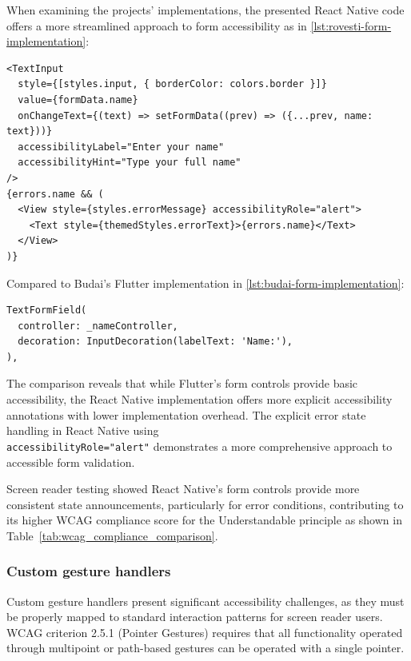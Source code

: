 When examining the projects' implementations, the presented React Native code offers a more streamlined approach to form accessibility as in \ref{lst:rovesti-form-implementation}:

\begin{lstlisting}[style=ReactNativeStyle, caption=Form implementation in AccessibleHub's React Native code, label=lst:rovesti-form-implementation]
<TextInput
  style={[styles.input, { borderColor: colors.border }]}
  value={formData.name}
  onChangeText={(text) => setFormData((prev) => ({...prev, name: text}))}
  accessibilityLabel="Enter your name"
  accessibilityHint="Type your full name"
/>
{errors.name && (
  <View style={styles.errorMessage} accessibilityRole="alert">
    <Text style={themedStyles.errorText}>{errors.name}</Text>
  </View>
)}
\end{lstlisting}

\pagebreak

Compared to Budai's Flutter implementation in \ref{lst:budai-form-implementation}:

\begin{lstlisting}[style=DartStyle, caption=Form implementation in Budai's Flutter code, label=lst:budai-form-implementation]
TextFormField(
  controller: _nameController,
  decoration: InputDecoration(labelText: 'Name:'),
),
\end{lstlisting}

The comparison reveals that while Flutter's form controls provide basic accessibility, the React Native implementation offers more explicit accessibility annotations with lower implementation overhead. The explicit error state handling in React Native using \\ \texttt{accessibilityRole="alert"} demonstrates a more comprehensive approach to accessible form validation.

Screen reader testing showed React Native's form controls provide more consistent state announcements, particularly for error conditions, contributing to its higher WCAG compliance score for the Understandable principle as shown in Table~\ref{tab:wcag_compliance_comparison}.

\subsubsection{Custom gesture handlers}
\label{subsubsec:gesture-handlers}

Custom gesture handlers present significant accessibility challenges, as they must be properly mapped to standard interaction patterns for screen reader users. WCAG criterion 2.5.1 (Pointer Gestures) requires that all functionality operated through multipoint or path-based gestures can be operated with a single pointer.

